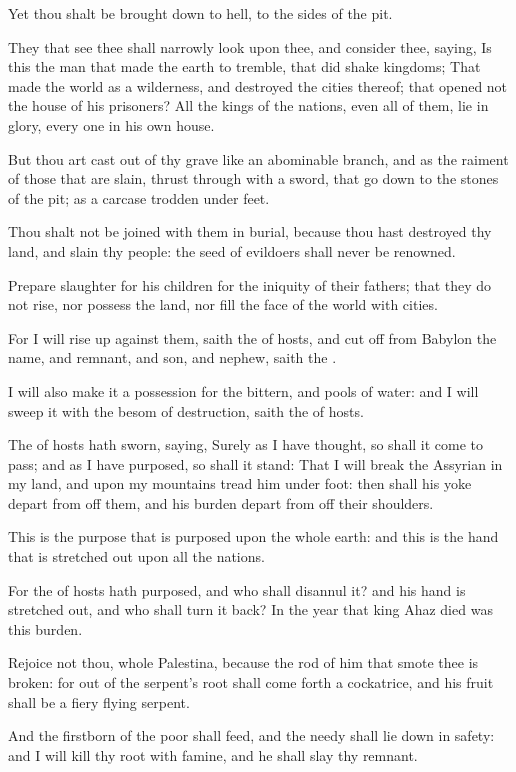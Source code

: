 \Verse Yet thou shalt be brought down to hell, to the sides of the pit.

\Verse They that see thee shall narrowly look upon thee, and consider thee, saying, Is this the man that made the earth to tremble, that did shake kingdoms; \Verse That made the world as a wilderness, and destroyed the cities thereof; that opened not the house of his prisoners?  \Verse All the kings of the nations, even all of them, lie in glory, every one in his own house.

\Verse But thou art cast out of thy grave like an abominable branch, and as the raiment of those that are slain, thrust through with a sword, that go down to the stones of the pit; as a carcase trodden under feet.

\Verse Thou shalt not be joined with them in burial, because thou hast destroyed thy land, and slain thy people: the seed of evildoers shall never be renowned.

\Verse Prepare slaughter for his children for the iniquity of their fathers; that they do not rise, nor possess the land, nor fill the face of the world with cities.

\Verse For I will rise up against them, saith the \LORD of hosts, and cut off from Babylon the name, and remnant, and son, and nephew, saith the \LORD.

\Verse I will also make it a possession for the bittern, and pools of water: and I will sweep it with the besom of destruction, saith the \LORD of hosts.

\Verse The \LORD of hosts hath sworn, saying, Surely as I have thought, so shall it come to pass; and as I have purposed, so shall it stand: \Verse That I will break the Assyrian in my land, and upon my mountains tread him under foot: then shall his yoke depart from off them, and his burden depart from off their shoulders.

\Verse This is the purpose that is purposed upon the whole earth: and this is the hand that is stretched out upon all the nations.

\Verse For the \LORD of hosts hath purposed, and who shall disannul it?  and his hand is stretched out, and who shall turn it back?  \Verse In the year that king Ahaz died was this burden.

\Verse Rejoice not thou, whole Palestina, because the rod of him that smote thee is broken: for out of the serpent's root shall come forth a cockatrice, and his fruit shall be a fiery flying serpent.

\Verse And the firstborn of the poor shall feed, and the needy shall lie down in safety: and I will kill thy root with famine, and he shall slay thy remnant.

